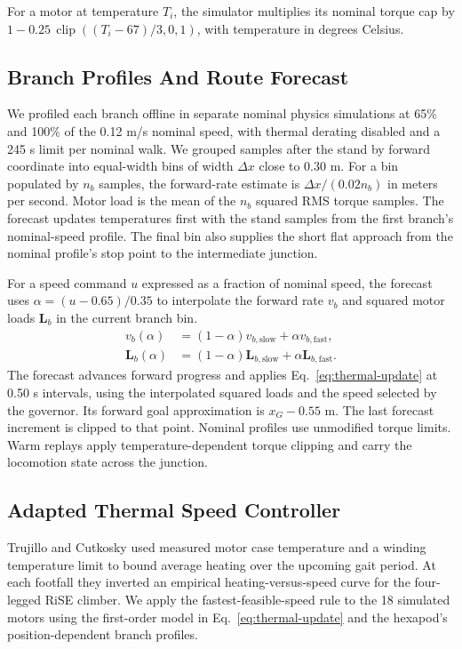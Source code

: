 \documentclass{ieeeaccess}
\begin{document}
For a motor at temperature $T_i$, the simulator multiplies its nominal torque cap by $1-0.25\,\operatorname{clip}((T_i-67)/3,0,1)$, with temperature in degrees Celsius.

\subsection{Branch Profiles And Route Forecast}

We profiled each branch offline in separate nominal physics simulations at 65\% and 100\% of the 0.12 m/s nominal speed, with thermal derating disabled and a 245 s limit per nominal walk. We grouped samples after the stand by forward coordinate into equal-width bins of width $\Delta x$ close to 0.30 m. For a bin populated by $n_b$ samples, the forward-rate estimate is $\Delta x/(0.02 n_b)$ in meters per second. Motor load is the mean of the $n_b$ squared RMS torque samples. The forecast updates temperatures first with the stand samples from the first branch's nominal-speed profile. The final bin also supplies the short flat approach from the nominal profile's stop point to the intermediate junction.

For a speed command $u$ expressed as a fraction of nominal speed, the forecast uses $\alpha=(u-0.65)/0.35$ to interpolate the forward rate $v_b$ and squared motor loads $\mathbf{L}_b$ in the current branch bin.
\begin{align}
 v_b(\alpha)&=(1-\alpha)v_{b,\mathrm{slow}}+\alpha v_{b,\mathrm{fast}},\\
 \mathbf{L}_b(\alpha)&=(1-\alpha)\mathbf{L}_{b,\mathrm{slow}}
                        +\alpha\mathbf{L}_{b,\mathrm{fast}} .
\end{align}
The forecast advances forward progress and applies Eq.~\eqref{eq:thermal-update} at 0.50 s intervals, using the interpolated squared loads and the speed selected by the governor. Its forward goal approximation is $x_G-0.55$ m. The last forecast increment is clipped to that point. Nominal profiles use unmodified torque limits. Warm replays apply temperature-dependent torque clipping and carry the locomotion state across the junction.

\subsection{Adapted Thermal Speed Controller}

Trujillo and Cutkosky \cite[Sec.~III-D, Eq.~(8)]{trujillo2009} used measured motor case temperature and a winding temperature limit to bound average heating over the upcoming gait period. At each footfall they inverted an empirical heating-versus-speed curve for the four-legged RiSE climber. We apply the fastest-feasible-speed rule to the 18 simulated motors using the first-order model in Eq.~\eqref{eq:thermal-update} and the hexapod's position-dependent branch profiles.
\end{document}
